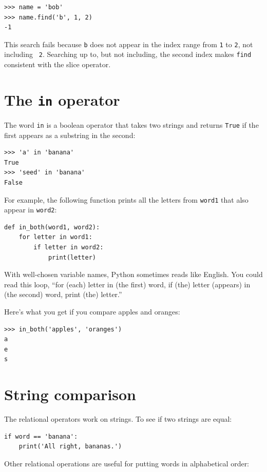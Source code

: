 \documentclass[10pt]{book}
\begin{document}
\begin{verbatim}
>>> name = 'bob'
>>> name.find('b', 1, 2)
-1
\end{verbatim}
%
This search fails because {\tt b} does not
appear in the index range from {\tt 1} to {\tt 2}, not including {\tt
2}.  Searching up to, but not including, the second index makes
{\tt find} consistent with the slice operator.



\section{The {\tt in} operator}
\label{inboth}

The word {\tt in} is a boolean operator that takes two strings and
returns {\tt True} if the first appears as a substring in the second:

\begin{verbatim}
>>> 'a' in 'banana'
True
>>> 'seed' in 'banana'
False
\end{verbatim}
%
For example, the following function prints all the
letters from {\tt word1} that also appear in {\tt word2}:

\begin{verbatim}
def in_both(word1, word2):
    for letter in word1:
        if letter in word2:
            print(letter)
\end{verbatim}
%
With well-chosen variable names,
Python sometimes reads like English.  You could read
this loop, ``for (each) letter in (the first) word, if (the) letter 
(appears) in (the second) word, print (the) letter.''

Here's what you get if you compare apples and oranges:

\begin{verbatim}
>>> in_both('apples', 'oranges')
a
e
s
\end{verbatim}
%

\section{String comparison}

The relational operators work on strings.  To see if two strings are equal:

\begin{verbatim}
if word == 'banana':
    print('All right, bananas.')
\end{verbatim}
%
Other relational operations are useful for putting words in alphabetical
order:
\end{document}
